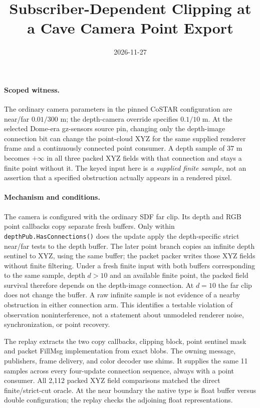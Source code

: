 \documentclass[11pt]{article}
\title{Subscriber-Dependent Clipping at a Cave Camera Point Export}
\date{2026-11-27}
\begin{document}
\maketitle
\paragraph{Scoped witness.}
The ordinary camera parameters in the pinned CoSTAR configuration are
near/far \(0.01/300\) m; the depth-camera override specifies \(0.1/10\) m.
At the selected Dome-era gz-sensors source pin, changing only the
depth-image connection bit can change the point-cloud XYZ for the
same supplied renderer frame and a continuously connected point consumer.
A depth sample of \(37\) m becomes \(+\infty\) in all three packed XYZ
fields with that connection and stays a finite point without it.
The keyed input here is \emph{a supplied finite sample}, not an assertion
that a specified obstruction actually appears in a rendered pixel.

\paragraph{Mechanism and conditions.}
The camera is configured with the ordinary SDF far clip. Its depth and
RGB point callbacks copy separate fresh buffers. Only within
\texttt{depthPub.HasConnections()} does the update apply the depth-specific
strict near/far tests to the depth buffer. The later point branch copies
an infinite depth sentinel to XYZ, using the same buffer; the packet
packer writes those XYZ fields without finite filtering. Under a fresh
finite input with both buffers corresponding to the same sample, depth
\(d>10\) and an available finite point, the packed field survival therefore
depends on the depth-image connection. At \(d=10\) the far clip does
not change the buffer. A raw infinite sample is not evidence of a
nearby obstruction in either connection arm. This identifies a
testable violation of observation noninterference, not a statement
about unmodeled renderer noise, synchronization, or point recovery.

The replay extracts the two copy callbacks, clipping block, point
sentinel mask and packet FillMsg implementation from exact blobs.
The owning message, publishers, frame delivery, and color decoder use
shims. It supplies the same 11 samples across every four-update
connection sequence, always with a point consumer. All 2,112 packed
XYZ field comparisons matched the direct finite/strict-cut oracle.
At the near boundary the native type is float buffer versus double
configuration; the replay checks the adjoining float representations.
\end{document}
